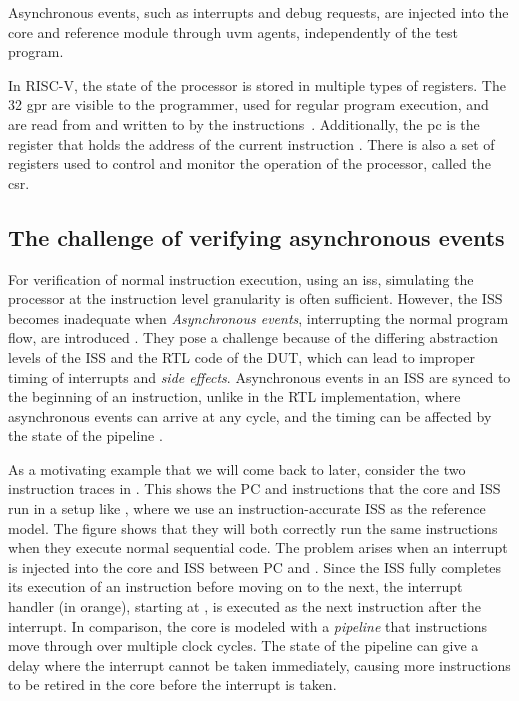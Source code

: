 Asynchronous events, such as interrupts and debug requests, are injected into the core and reference module through \acrshort{uvm} agents, independently of the test program.

In RISC-V, the state of the processor is stored in multiple types of registers. The 32 \acrfull{gpr} are visible to the programmer, used for regular program execution, and are read from and written to by the instructions~\cite{watermanRISCVInstructionSet2019}. Additionally, the \acrfull{pc} is the register that holds the address of the current instruction \cite{watermanRISCVInstructionSet2019}. There is also a set of registers used to control and monitor the operation of the processor, called the \acrfull{csr}. 



\subsection{The challenge of verifying asynchronous events}

For verification of normal instruction execution, using an \acrfull{iss}, simulating the processor at the instruction level granularity is often sufficient. However, the ISS becomes inadequate when \textit{Asynchronous events}, interrupting the normal program flow, are introduced \cite{taylorAdvancedRISCVVerification2023}. They pose a challenge because of the differing abstraction levels of the ISS and the RTL code of the DUT, which can lead to improper timing of interrupts and \textit{side effects}. Asynchronous events in an ISS are synced to the beginning of an instruction, unlike in the RTL implementation, where asynchronous events can arrive at any cycle, and the timing can be affected by the state of the pipeline \cite{taylorAdvancedRISCVVerification2023}.


As a motivating example that we will come back to later, consider the two instruction traces in . This shows the PC and instructions that the core and ISS run in a setup like , where we use an instruction-accurate ISS as the reference model. The figure shows that they will both correctly run the same instructions when they execute normal sequential code. The problem arises when an interrupt is injected into the core and ISS between PC  and . Since the ISS fully completes its execution of an instruction before moving on to the next, the interrupt handler (in orange), starting at , is executed as the next instruction after the interrupt. In comparison, the core is modeled with a \textit{pipeline} that instructions move through over multiple clock cycles. The state of the pipeline can give a delay where the interrupt cannot be taken immediately, causing more instructions to be retired in the core before the interrupt is taken. 


